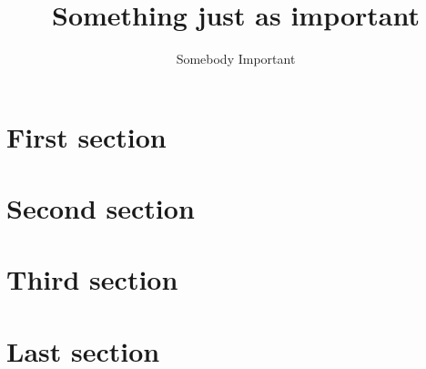\documentclass{article}
\begin{document}
\begin{titlepage}
	\thispagestyle{empty}
	\author{Somebody Important}
	\title{Something just as important}
	\maketitle
	\lipsum[1-2]
\end{titlepage}


\section{First section} \lipsum[1-4]
\section{Second section} \lipsum[5-8]
\section{Third section} \lipsum[9-12]
\section{Last section} \lipsum[13-16]
\end{document}
